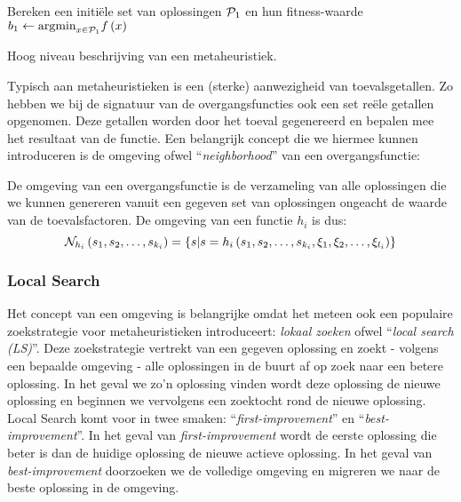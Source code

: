 \begin{algorithm}[H]
 \SetAlgoLined
 Bereken een initi\"ele set van oplossingen $\mathcal{P}_1$ en hun fitness-waarde\;
 $b_1\leftarrow\displaystyle\mbox{argmin}_{x\in\mathcal{P}_1}{f\left(x\right)}$\;
 \caption{Hoog niveau beschrijving van een metaheuristiek\cite{DBLP:journals/jc/ShonkwilerV94}.}
\end{algorithm}

Typisch aan metaheuristieken is een (sterke) aanwezigheid van toevalsgetallen. Zo hebben we bij de signatuur van de overgangsfuncties ook een set re\"ele getallen opgenomen. Deze getallen worden door het toeval gegenereerd en bepalen mee het resultaat van de functie. Een belangrijk concept die we hiermee kunnen introduceren is de omgeving ofwel ``\emph{neighborhood}'' van een overgangsfunctie:

\begin{definition}
De omgeving van een overgangsfunctie is de verzameling van alle oplossingen die we kunnen genereren vanuit een gegeven set van oplossingen ongeacht de waarde van de toevalsfactoren. De omgeving van een functie $h_i$ is dus:
\begin{equation}
\mathcal{N}_{h_i}\left(s_1,s_2,\ldots,s_{k_i}\right)=\left\{ s|s=h_i\left(s_1,s_2,\ldots,s_{k_i},\xi_1,\xi_2,\ldots,\xi_{l_i}\right)\right\}
\end{equation}
\end{definition}

\subsubsection{Local Search}
Het concept van een omgeving is belangrijke omdat het meteen ook een populaire zoekstrategie voor metaheuristieken introduceert: \emph{lokaal zoeken} ofwel ``\emph{local search (LS)}''. Deze zoekstrategie vertrekt van een gegeven oplossing en zoekt - volgens een bepaalde omgeving - alle oplossingen in de buurt af op zoek naar een betere oplossing. In het geval we zo'n oplossing vinden wordt deze oplossing de nieuwe oplossing en beginnen we vervolgens een zoektocht rond de nieuwe oplossing. Local Search komt voor in twee smaken: ``\emph{first-improvement}'' en ``\emph{best-improvement}''. In het geval van \emph{first-improvement} wordt de eerste oplossing die beter is dan de huidige oplossing de nieuwe actieve oplossing. In het geval van \emph{best-improvement} doorzoeken we de volledige omgeving en migreren we naar de beste oplossing in de omgeving.

